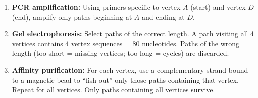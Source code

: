 \begin{enumerate}[leftmargin=1.8em]
  \item \textbf{PCR amplification:} Using primers specific to vertex $A$ (start) and vertex $D$ (end), amplify only paths beginning at $A$ and ending at $D$.
  \item \textbf{Gel electrophoresis:} Select paths of the correct length. A path visiting all 4 vertices contains 4 vertex sequences = 80 nucleotides. Paths of the wrong length (too short = missing vertices; too long = cycles) are discarded.
  \item \textbf{Affinity purification:} For each vertex, use a complementary strand bound to a magnetic bead to ``fish out'' only those paths containing that vertex. Repeat for all vertices. Only paths containing all vertices survive.
\end{enumerate}

